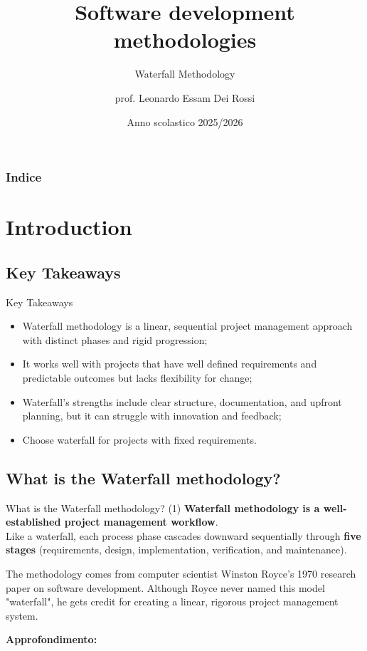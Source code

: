 \documentclass[
    notheorems,
    11pt,
    compress,
    aspectratio=169
]{beamer}
\title[Waterfall Methodology]{Software development methodologies}
\subtitle{Waterfall Methodology}
\author{prof. Leonardo Essam Dei Rossi}
\institute[]{ITT "M. Buonarroti" - Trento (TN)}
\date[A.S. 2025/2026]{Anno scolastico 2025/2026}
\begin{document}
\setlength{\baselineskip}{15pt}

\begin{frame}
\titlepage
\end{frame}

\begin{frame}
    \frametitle{Indice}

    \tableofcontents
\end{frame}


\section{Introduction}

\subsection{Key Takeaways}

\begin{frame}{Key Takeaways}
    \begin{itemize}
        \item Waterfall methodology is a linear, sequential project management approach with distinct phases and rigid progression;
        \pause
        \item It works well with projects that have well defined requirements and predictable outcomes but lacks flexibility for change;
        \pause
        \item Waterfall’s strengths include clear structure, documentation, and upfront planning, but it can struggle with innovation and feedback;
        \pause
        \item Choose waterfall for projects with fixed requirements.
    \end{itemize}
\end{frame}


\subsection{What is the Waterfall methodology?}

\begin{frame}{What is the Waterfall methodology? (1)}
    \textbf{Waterfall methodology is a well-established project management workflow}.
    \\
    Like a waterfall, each process phase cascades downward sequentially through \textbf{five stages} (requirements, design, implementation, verification, and maintenance).

    \pause
    \vspace{\baselineskip}

    The methodology comes from computer scientist Winston Royce’s 1970 research paper on software development. Although Royce never named this model "waterfall", he gets credit for creating a linear, rigorous project management system.

    \vfill

    \textbf{Approfondimento:} \cite{atlassian:waterfall}
\end{frame}
\end{document}
